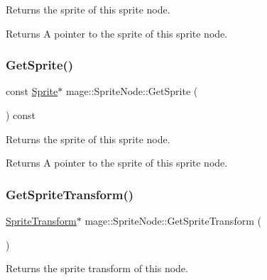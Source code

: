 Returns the sprite of this sprite node.

\begin{DoxyReturn}{Returns}
A pointer to the sprite of this sprite node. 
\end{DoxyReturn}
\hypertarget{classmage_1_1_sprite_node_a585276a679d83576464014eeb156cf10}{}\label{classmage_1_1_sprite_node_a585276a679d83576464014eeb156cf10} 
\subsubsection{\texorpdfstring{Get\+Sprite()}{GetSprite()}\hspace{0.1cm}{\footnotesize\ttfamily [2/2]}}
{\footnotesize\ttfamily const \hyperlink{classmage_1_1_sprite}{Sprite}$\ast$ mage\+::\+Sprite\+Node\+::\+Get\+Sprite (\begin{DoxyParamCaption}{ }\end{DoxyParamCaption}) const\hspace{0.3cm}{\ttfamily [noexcept]}}

Returns the sprite of this sprite node.

\begin{DoxyReturn}{Returns}
A pointer to the sprite of this sprite node. 
\end{DoxyReturn}
\hypertarget{classmage_1_1_sprite_node_a99d90a2a337a45c0623022756c53f214}{}\label{classmage_1_1_sprite_node_a99d90a2a337a45c0623022756c53f214} 
\subsubsection{\texorpdfstring{Get\+Sprite\+Transform()}{GetSpriteTransform()}\hspace{0.1cm}{\footnotesize\ttfamily [1/2]}}
{\footnotesize\ttfamily \hyperlink{classmage_1_1_sprite_transform}{Sprite\+Transform}$\ast$ mage\+::\+Sprite\+Node\+::\+Get\+Sprite\+Transform (\begin{DoxyParamCaption}{ }\end{DoxyParamCaption})\hspace{0.3cm}{\ttfamily [noexcept]}}

Returns the sprite transform of this node.


